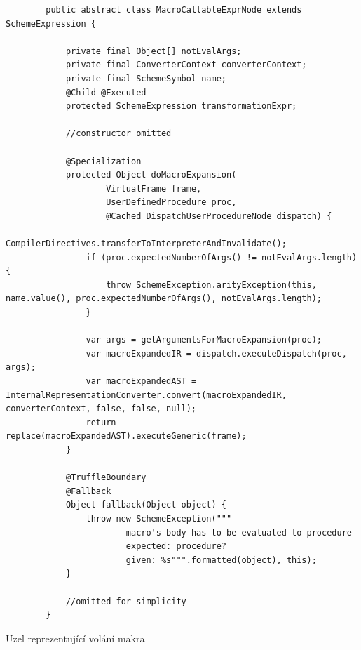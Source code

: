 \documentclass[
  master,
  biblatex,
  figures=true,
  theorems,
  sourcecodes,
  glossaries,
  index
]{kidiplom}
\begin{document}
\begin{listing} 
    \begin{verbatim}
        public abstract class MacroCallableExprNode extends SchemeExpression {
    
            private final Object[] notEvalArgs;
            private final ConverterContext converterContext;
            private final SchemeSymbol name;
            @Child @Executed
            protected SchemeExpression transformationExpr;
    
            //constructor omitted
    
            @Specialization
            protected Object doMacroExpansion(
                    VirtualFrame frame,
                    UserDefinedProcedure proc,
                    @Cached DispatchUserProcedureNode dispatch) {
                CompilerDirectives.transferToInterpreterAndInvalidate();
                if (proc.expectedNumberOfArgs() != notEvalArgs.length) {
                    throw SchemeException.arityException(this, name.value(), proc.expectedNumberOfArgs(), notEvalArgs.length);
                }
    
                var args = getArgumentsForMacroExpansion(proc);
                var macroExpandedIR = dispatch.executeDispatch(proc, args);
                var macroExpandedAST = InternalRepresentationConverter.convert(macroExpandedIR, converterContext, false, false, null);
                return replace(macroExpandedAST).executeGeneric(frame);
            }
    
            @TruffleBoundary
            @Fallback
            Object fallback(Object object) {
                throw new SchemeException("""
                        macro's body has to be evaluated to procedure
                        expected: procedure?
                        given: %s""".formatted(object), this);
            }
    
            //omitted for simplicity
        }
    \end{verbatim}
    \caption{Uzel reprezentující volání makra}
    \label{MacroCallableExprNode}
\end{listing}


\clearpage
\end{document}

